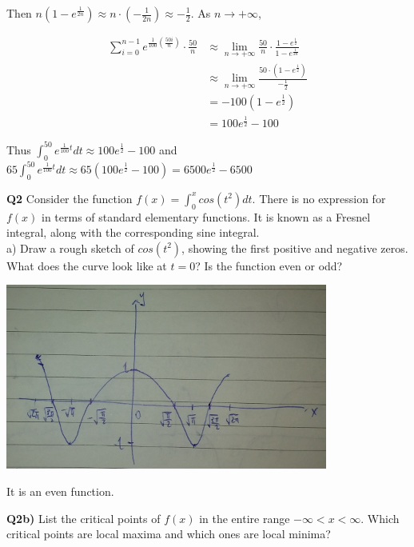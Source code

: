 \documentclass[9pt]{article}
\begin{document}
Then $n(1 - e^{\frac{1}{2n}}) \approx n \cdot (- \frac{1}{2n}) \approx -\frac{1}{2}$. As $n \rightarrow +\infty$,

\begin{align*}
  \sum\limits_{i=0}^{n-1} e^{\frac{1}{100}(\frac{50i}{n})} \cdot \frac{50}{n} &\approx \lim_{n \rightarrow +\infty} \frac{50}{n} \cdot \frac{1 - e^{\frac{1}{2}}}{1 - e ^{\frac{1}{2n}}} \\
  &\approx \lim_{n \rightarrow +\infty} \frac{50 \cdot (1 - e^{\frac{1}{2}})}{-\frac{1}{2}} \\
  &= -100(1 - e^{\frac{1}{2}}) \\
  &= 100e^{\frac{1}{2}} - 100
\end{align*}

Thus $\int_0^{50} e^{\frac{1}{100}t} dt \approx 100e^{\frac{1}{2}} - 100$ and $65 \int_0^{50} e^{\frac{1}{100}t} dt \approx 65(100e^{\frac{1}{2}} - 100) = 6500e^{\frac{1}{2}} - 6500$


\begin{tcolorbox}
  \textbf{Q2} Consider the function $f(x) = \int_0^{x} cos(t^2) dt$. There is no expression for $f(x)$ in terms of standard elementary functions. It is known as a Fresnel integral, along with the corresponding sine integral. \\
  a) Draw a rough sketch of $cos(t^2)$, showing the first positive and negative zeros. What does the curve look like at $t = 0$? Is the function even or odd?
\end{tcolorbox}

\begin{center}
  \includegraphics{q2a.jpg}
\end{center}

It is an even function.

\begin{tcolorbox}
  \textbf{Q2b)} List the critical points of $f(x)$ in the entire range $-\infty < x < \infty$. Which critical points are local maxima and which ones are local minima?
\end{tcolorbox}
\end{document}
